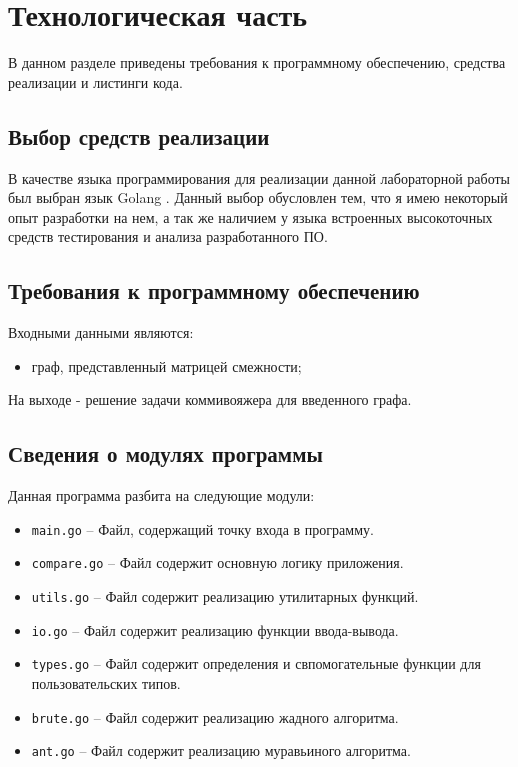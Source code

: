 \chapter{Технологическая часть}

В данном разделе приведены требования к программному обеспечению, средства реализации и листинги кода.

\section{Выбор средств реализации}

В качестве языка программирования для реализации данной лабораторной работы был выбран язык Golang \cite{golang}. Данный выбор обусловлен тем, что я имею некоторый опыт разработки на нем, а так же наличием у языка встроенных высокоточных средств тестирования и анализа разработанного ПО. 

\section{Требования к программному обеспечению}

Входными данными являются:
\begin{itemize}
    \item граф, представленный матрицей смежности;
\end{itemize}

На выходе - решение задачи коммивояжера для введенного графа.


\section{Сведения о модулях программы}

Данная программа разбита на следующие модули:
\begin{itemize}
\item \texttt{main.go} -- Файл, содержащий точку входа в программу.
\item \texttt{compare.go} -- Файл содержит основную логику приложения.
\item \texttt{utils.go} -- Файл содержит реализацию утилитарных функций.
\item \texttt{io.go} -- Файл содержит реализацию функции ввода-вывода.
\item \texttt{types.go} -- Файл содержит определения и свпомогательные функции для пользовательских типов.
\item \texttt{brute.go} -- Файл содержит реализацию жадного алгоритма.
\item \texttt{ant.go} -- Файл содержит реализацию муравьиного алгоритма.
\end{itemize}

